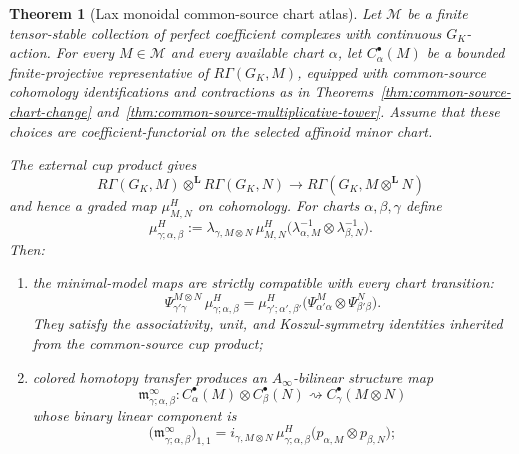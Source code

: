 \documentclass[11pt]{article}
\newtheorem{theorem}{Theorem}[section]
\theoremstyle{definition}
\begin{document}
\begin{theorem}[Lax monoidal common-source chart atlas]\label{thm:common-source-lax-monoidal-tower}
Let $\mathcal M$ be a finite tensor-stable collection of perfect coefficient complexes with continuous $G_K$-action.  For every $M\in\mathcal M$ and every available chart $\alpha$, let $C_\alpha^\bullet(M)$ be a bounded finite-projective representative of $R\Gamma(G_K,M)$, equipped with common-source cohomology identifications and contractions as in Theorems~\ref{thm:common-source-chart-change} and~\ref{thm:common-source-multiplicative-tower}.  Assume that these choices are coefficient-functorial on the selected affinoid minor chart.

The external cup product gives
\begin{equation}\label{eq:common-source-external-cup}
 R\Gamma(G_K,M)\otimes^{\mathbf L}R\Gamma(G_K,N)
 \longrightarrow
 R\Gamma\!\left(G_K,M\otimes^{\mathbf L}N\right)
\end{equation}
and hence a graded map $\mu^H_{M,N}$ on cohomology.  For charts $\alpha,\beta,\gamma$ define
\begin{equation}\label{eq:minimal-lax-monoidal-chart-map}
 \mu^H_{\gamma;\alpha,\beta}
 :=\lambda_{\gamma,M\otimes N}\,\mu^H_{M,N}
 \bigl(\lambda_{\alpha,M}^{-1}\otimes
       \lambda_{\beta,N}^{-1}\bigr).
\end{equation}
Then:
\begin{enumerate}[label=\textnormal{(\roman*)}]
\item the minimal-model maps are strictly compatible with every chart transition:
\begin{equation}\label{eq:lax-monoidal-tower-naturality}
 \Psi^{M\otimes N}_{\gamma'\gamma}\,
 \mu^H_{\gamma;\alpha,\beta}
 =
 \mu^H_{\gamma';\alpha',\beta'}
 \bigl(\Psi^M_{\alpha'\alpha}\otimes
       \Psi^N_{\beta'\beta}\bigr).
\end{equation}
They satisfy the associativity, unit, and Koszul-symmetry identities inherited from the common-source cup product;
\item colored homotopy transfer produces an $A_\infty$-bilinear structure map
\[
 \mathfrak m^{\infty}_{\gamma;\alpha,\beta}:
 C_\alpha^\bullet(M)\otimes C_\beta^\bullet(N)
 \rightsquigarrow
 C_\gamma^\bullet(M\otimes N)
\]
whose binary linear component is
\begin{equation}\label{eq:lax-monoidal-chain-linear-term}
 \bigl(\mathfrak m^{\infty}_{\gamma;\alpha,\beta}\bigr)_{1,1}
 =i_{\gamma,M\otimes N}\,
   \mu^H_{\gamma;\alpha,\beta}
   \bigl(p_{\alpha,M}\otimes p_{\beta,N}\bigr);

\end{equation}
\end{enumerate}
\end{theorem}
\end{document}

